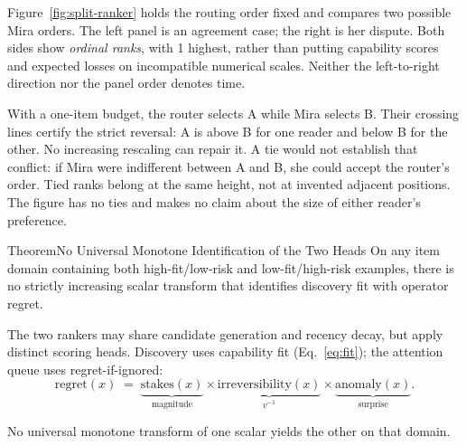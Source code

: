 \documentclass[11pt,a4paper]{article}
\theoremstyle{definition}
\theoremstyle{plain}
\begin{document}
Figure~\ref{fig:split-ranker} holds the routing order fixed and compares two
possible Mira orders. The left panel is an agreement case; the right is her
dispute. Both sides show \emph{ordinal ranks}, with 1 highest, rather than
putting capability scores and expected losses on incompatible numerical
scales. Neither the left-to-right direction nor the panel order denotes time.

%


With a one-item budget, the router selects A while Mira selects B. Their
crossing lines certify the strict reversal: A is above B for one reader and
below B for the other. No increasing rescaling can repair it. A tie would
not establish that conflict: if Mira were indifferent between A and B, she
could accept the router's order. Tied ranks belong at the same height, not
at invented adjacent positions. The figure has no ties and makes no claim
about the size of either reader's preference.

\begin{pdclaim}{Theorem}{No Universal Monotone Identification of the Two Heads}
\setlength{\parskip}{4pt plus 1pt}
\label{thm:split-ranker}
On any item domain containing both high-fit/low-risk and low-fit/high-risk examples,
there is no strictly increasing scalar transform that identifies discovery fit with
operator regret.

The two rankers may share candidate generation and recency decay,
but apply distinct scoring heads. Discovery uses capability fit
(Eq.~\ref{eq:fit}); the attention queue uses regret-if-ignored:
\begin{equation}\label{eq:regret}
\mathrm{regret}(x) \;=\; \underbrace{\mathrm{stakes}(x)}_{\text{magnitude}}
   \times \underbrace{\mathrm{irreversibility}(x)}_{v^{-1}}
   \times \underbrace{\mathrm{anomaly}(x)}_{\text{surprise}}.
\end{equation}

No universal monotone transform of one scalar yields the other on that domain.
\end{pdclaim}
\end{document}
